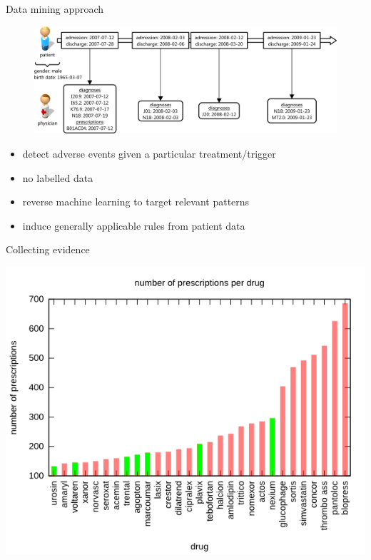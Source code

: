 \message{ !name(presentation.tex)}\documentclass{beamer}
\begin{document}
\begin{frame}{Data mining approach}


 \begin{minipage}{\textwidth}
\begin{figure}
\includegraphics[width=\textwidth,keepaspectratio]{timeline_final2}
\end{figure}
  \end{minipage}
  \vfill
  \begin{minipage}{\textwidth}
\begin{itemize}
\item detect adverse events given a particular treatment/trigger \pause
\item no labelled data \pause
\item reverse machine learning to target relevant patterns \pause
\item induce generally applicable rules from patient data
\end{itemize}
\end{minipage}
\end{frame}

\begin{frame}{Collecting evidence}
\begin{table}[!ht]  
\includegraphics[width=\textwidth,height=.88\textheight,keepaspectratio]{plot_drug_prescriptions}
\end{table}
\end{frame}
\end{document}
